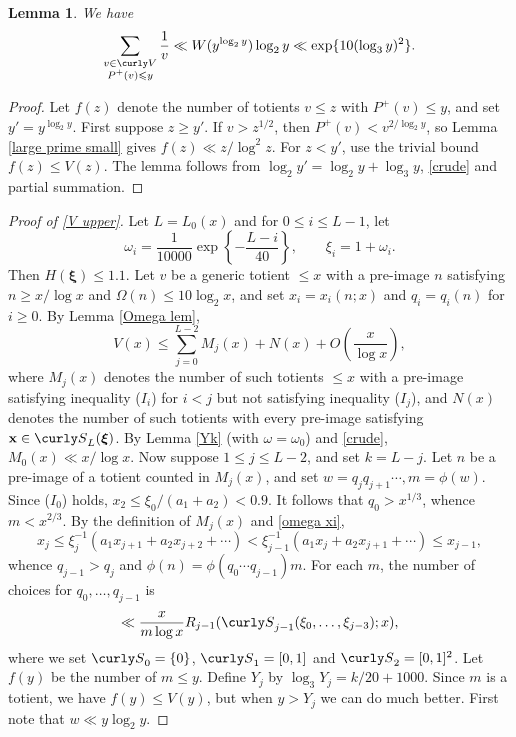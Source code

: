 \documentclass[11pt]{amsart}
\theoremstyle{remark}
\theoremstyle{plain}
\newtheorem{lem}{Lemma}[section]
\numberwithin{equation}{section}
\newcommand{\be}{\begin{equation}}
\newcommand{\ee}{\end{equation}}
\renewcommand{\(}{\left(}
\renewcommand{\)}{\right)}
\newcommand{\pfrac}[2]{\left(\frac{#1}{#2}\right)}
\newcommand{\fancyS}{{\curly S}}
\newcommand{\fancyV}{\curly V}
\renewcommand{\le}{\leqslant}
\renewcommand{\ge}{\geqslant}
\newcommand{\om}{\Omega}
\newcommand{\bxi}{\boldsymbol\xi}
\newcommand{\vxi}{\bxi}
\newcommand{\vx}{\mathbf{x}}
\begin{document}
\begin{lem} \label{sum 1/v}  We have
$$
\sum_{\substack{ v\in \fancyV \\ P^+(v)\le y }} \frac1{v} \ll W(y^{\log_2 y})
\log_2 y \ll \exp\{10(\log_3 y)^2\}.
$$
\end{lem}
\begin{proof}
Let $f(z)$ denote the number of totients $v\le z$ with $P^+(v)\le y$,
and set $y'=y^{\log_2 y}$.  First suppose $z\ge y'$.  If $v>z^{1/2}$,
then $P^+(v) < v^{2/\log_2 y}$, so Lemma \ref{large prime small} gives
$f(z)\ll z/\log^2 z$.  For $z<y'$, use the trivial bound $f(z)\le V(z)$.
The lemma follows from $\log_2 y' = \log_2 y + \log_3 y$, \eqref{crude}
and partial summation.
 \end{proof}

\begin{proof}[Proof of \eqref{V upper}]
Let $L=L_0(x)$ and for $0\le i\le L-1$, let
\be\label{omega xi}
\omega_i = \frac{1}{10000} \exp \left\{ - \frac{L-i}{40} \right\}, \qquad \xi_i=1+\omega_i.
\ee
Then $H(\vxi)\le 1.1$.  Let $v$ be a generic
totient $\le x$ with a pre-image $n$ satisfying
$n\ge x/\log x$ and $\om(n)\le 10\log_2 x$, and set
$x_i=x_i(n;x)$ and $q_i=q_i(n)$ for $i\ge 0$.  By Lemma \ref{Omega lem},
$$
V(x) \le \sum_{j=0}^{L-2} M_j(x) + N(x) + O\pfrac{x}{\log x},
$$
where $M_j(x)$ denotes the number of such totients $\le x$
with a pre-image satisfying
inequality ($I_i$) for $i<j$ but not satisfying inequality ($I_j$), and
$N(x)$ denotes the number of such totients with every pre-image satisfying
 $\vx\in \fancyS_L(\vxi)$.
By Lemma \ref{Yk} (with $\omega=\omega_0$) and \eqref{crude},
$M_0(x) \ll x/\log x.$
Now suppose $1\le j\le L-2$, and set $k=L-j$.
Let $n$ be a pre-image of a totient counted in $M_j(x)$, and set
$w = q_j q_{j+1} \cdots, m=\phi(w).$
Since ($I_0$) holds, $x_2 \le \xi_0/
(a_1+a_2) <0.9$.  It follows that $q_0 > x^{1/3}$, whence $m<x^{2/3}$.
By the definition of $M_j(x)$ and \eqref{omega xi},
$$
x_j \le \xi_j^{-1} (a_1x_{j+1} + a_2x_{j+2} + \cdots) < \xi_{j-1}^{-1}
(a_1 x_j + a_2 x_{j+1} + \cdots) \le x_{j-1},
$$
whence $q_{j-1}>q_j$ and
$\phi(n)=\phi(q_0 \cdots q_{j-1})m$.
For each $m$, the number of choices for $q_0, \ldots, q_{j-1}$ is
$$
\ll \frac{x}{m\log x} 
R_{j-1}(\fancyS_{j-1}(\xi_0, \ldots,\xi_{j-3});x),
$$
where we set $\fancyS_0=\{0\}$, $\fancyS_1=[0,1]$ and $\fancyS_2=[0,1]^2$.
Let $f(y)$ be the number of $m\le y$.
Define $Y_j$ by $\log_3 Y_j = k/20+1000$.
Since $m$ is a totient, we have $f(y) \le V(y)$, but when $y>Y_j$
we can do much better.
First note that $w\ll y\log_2 y$.

\end{proof}
\end{document}
